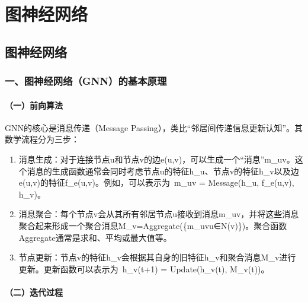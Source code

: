 \hypertarget{ux56feux795eux7ecfux7f51ux7edc}{%
\chapter{图神经网络}\label{ux56feux795eux7ecfux7f51ux7edc}}

\hypertarget{ux56feux795eux7ecfux7f51ux7edc-1}{%
\section{图神经网络}\label{ux56feux795eux7ecfux7f51ux7edc-1}}

\hypertarget{ux4e00ux56feux795eux7ecfux7f51ux7edcgnnux7684ux57faux672cux539fux7406}{%
\subsection{一、图神经网络（GNN）的基本原理}\label{ux4e00ux56feux795eux7ecfux7f51ux7edcgnnux7684ux57faux672cux539fux7406}}

\hypertarget{ux4e00ux524dux5411ux7b97ux6cd5}{%
\subsubsection{（一）前向算法}\label{ux4e00ux524dux5411ux7b97ux6cd5}}

GNN的核心是消息传递（Message Passing），类比``邻居间传递信息更新认知''。其数学流程分为三步：

\begin{enumerate}
\def\labelenumi{\arabic{enumi}.}
\item
  消息生成：对于连接节点u和节点v的边e(u,v)，可以生成一个``消息''m\_uv。这个消息的生成函数通常会同时考虑节点u的特征h\_u、节点v的特征h\_v以及边e(u,v)的特征f\_e(u,v)。例如，可以表示为~m\_uv = Message(h\_u, f\_e(u,v), h\_v)。
\item
  消息聚合：每个节点v会从其所有邻居节点u接收到消息m\_uv，并将这些消息聚合起来形成一个聚合消息M\_v=Aggregate(\{m\_uv\textbar u∈N(v)\})。聚合函数Aggregate通常是求和、平均或最大值等。
\item
  节点更新：节点v的特征h\_v会根据其自身的旧特征h\_v和聚合消息M\_v进行更新。更新函数可以表示为~h\_v(t+1) = Update(h\_v(t), M\_v(t))。
\end{enumerate}

\hypertarget{ux4e8cux8fedux4ee3ux8fc7ux7a0b}{%
\subsubsection{（二）迭代过程\hspace{0pt}}\label{ux4e8cux8fedux4ee3ux8fc7ux7a0b}}

